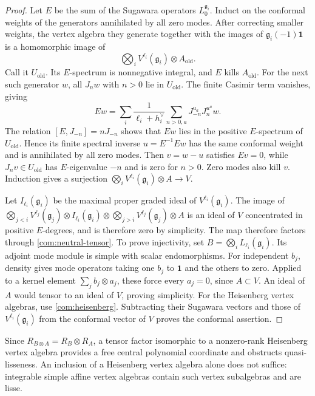 \documentclass[11pt,a4paper]{amsart}
\numberwithin{equation}{section}
\theoremstyle{definition}
\theoremstyle{remark}
\newcommand{\g}{\mathfrak g}
\begin{document}
\begin{proof}
Let $E$ be the sum of the Sugawara operators $L_0^{\g_i}$. Induct on the
conformal weights of the generators annihilated by all zero modes. After correcting smaller
weights, the vertex algebra they generate together with the images of
$\g_i(-1)\mathbf1$ is a homomorphic image of
$$
  \bigotimes_i V^{\ell_i}(\g_i)\otimes A_{\mathrm{old}}.
$$
Call it $U_{\mathrm{old}}$. Its $E$-spectrum is nonnegative integral,
and $E$ kills $A_{\mathrm{old}}$. For the next such generator $w$,
all $J_nw$ with $n>0$ lie in $U_{\mathrm{old}}$. The finite Casimir
term vanishes, giving
$$
 Ew=\sum_i\frac1{\ell_i+h_i^\vee}
       \sum_{n>0,a}J^{u_a}_{-n}J^{u^a}_n w.
$$
The relation $[E,J_{-n}]=nJ_{-n}$ shows that $Ew$ lies in the positive
$E$-spectrum of $U_{\mathrm{old}}$. Hence its finite spectral inverse
$u=E^{-1}Ew$ has the same conformal weight and is annihilated by all zero modes.
Then $v=w-u$ satisfies $Ev=0$, while $J_nv\in U_{\mathrm{old}}$
has $E$-eigenvalue $-n$ and is zero for $n>0$. Zero modes also kill
$v$. Induction gives a surjection
$\bigotimes_i V^{\ell_i}(\g_i)\otimes A\to V$.

Let $I_{\ell_i}(\g_i)$ be the maximal proper graded ideal of
$V^{\ell_i}(\g_i)$. The image of
$\bigotimes_{j<i}V^{\ell_j}(\g_j)\otimes I_{\ell_i}(\g_i)
\otimes\bigotimes_{j>i}V^{\ell_j}(\g_j)\otimes A$
is an ideal of $V$ concentrated in positive $E$-degrees, and is
therefore zero by simplicity. The map
therefore factors through \eqref{com:neutral-tensor}. To prove
injectivity, set $B=\bigotimes_iL_{\ell_i}(\g_i)$. Its adjoint mode
module is simple with scalar endomorphisms. For independent $b_j$,
density gives mode operators taking one $b_j$ to $\mathbf1$ and
the others to zero. Applied to a kernel element
$\sum_jb_j\otimes a_j$, these force every $a_j=0$, since $A\subset V$.
An ideal of $A$ would tensor to an ideal of $V$, proving simplicity.
For the Heisenberg vertex algebras, use \cref{com:heisenberg}.
Subtracting their Sugawara vectors and those of $V^{\ell_i}(\g_i)$
from the conformal vector of $V$ proves the conformal assertion.
\end{proof}

Since $R_{B\otimes A}=R_B\otimes R_A$, a tensor factor isomorphic to a nonzero-rank Heisenberg vertex algebra
provides a free central polynomial coordinate and obstructs
quasi-lisseness. An inclusion of a Heisenberg vertex algebra alone does not suffice:
integrable simple affine vertex algebras contain such vertex
subalgebras and are lisse.
\end{document}
